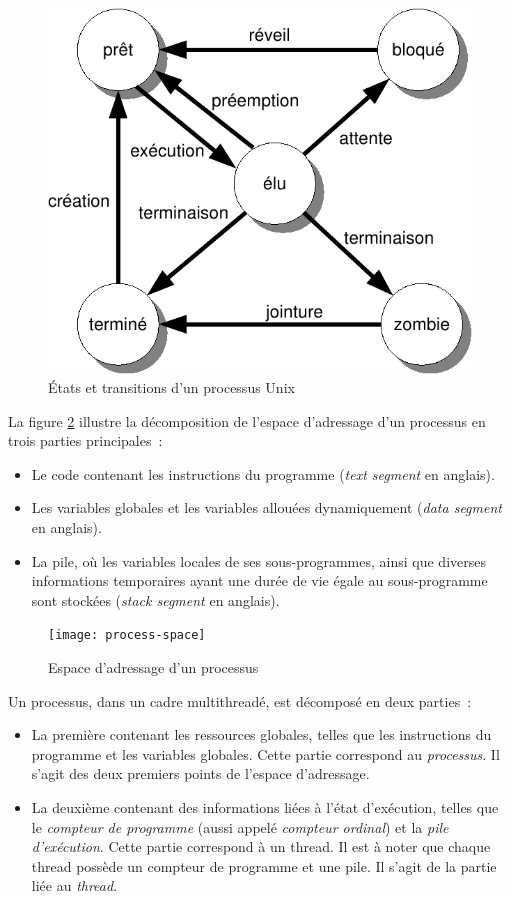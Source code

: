 \begin{figure}[ht]
  \centering
  \includegraphics{images/process-state-unix}
  \caption{\label{fig:process-state-unix}États et transitions d'un processus Unix}

\end{figure}

La figure \ref{fig:process-space} illustre la décomposition de l'espace d'adressage d'un processus en trois parties principales~:
\begin{itemize}
  \item Le code contenant les instructions du programme (\emph{text segment} en anglais).
  \item Les variables globales et les variables allouées dynamiquement (\emph{data segment} en anglais).
  \item La pile, où les variables locales de ses sous-programmes, ainsi que diverses informations temporaires ayant une durée de vie égale au sous-programme sont stockées (\emph{stack segment} en anglais).
\end{itemize}

\begin{figure}[ht]
  \centering
  \texttt{[image: process-space]}
  \caption{\label{fig:process-space}Espace d'adressage d'un processus}

\end{figure}


Un processus, dans un cadre multithreadé, est décomposé en deux parties~:
\begin{itemize}
  \item La première contenant les ressources globales, telles que les instructions du programme et les variables globales. Cette partie correspond au \emph{processus}. Il s'agit des deux premiers points de l'espace d'adressage.
  \item La deuxième contenant des informations liées à l'état d'exécution, telles que le \emph{compteur de programme} (aussi appelé \emph{compteur ordinal}) et la \emph{pile d'exécution}. Cette partie correspond à un thread. Il est à noter que chaque thread possède un compteur de programme et une pile. Il s'agit de la partie liée au \emph{thread}.
\end{itemize}

